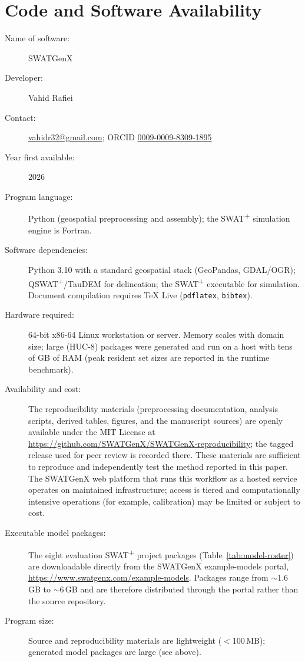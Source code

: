 \section*{Code and Software Availability}

\noindent
\begin{description}
  \item[Name of software:] SWATGenX
  \item[Developer:] Vahid Rafiei
  \item[Contact:] \href{mailto:vahidr32@gmail.com}{vahidr32@gmail.com}; ORCID \href{https://orcid.org/0009-0009-8309-1895}{0009-0009-8309-1895}
  \item[Year first available:] 2026
  \item[Program language:] Python (geospatial preprocessing and assembly); the SWAT\textsuperscript{+} simulation engine is Fortran.
  \item[Software dependencies:] Python 3.10 with a standard geospatial stack (GeoPandas, GDAL/OGR); QSWAT\textsuperscript{+}/TauDEM for delineation; the SWAT\textsuperscript{+} executable for simulation. Document compilation requires TeX Live (\texttt{pdflatex}, \texttt{bibtex}).
  \item[Hardware required:] 64-bit x86-64 Linux workstation or server. Memory scales with domain size; large (HUC-8) packages were generated and run on a host with tens of GB of RAM (peak resident set sizes are reported in the runtime benchmark).
  \item[Availability and cost:] The reproducibility materials (preprocessing documentation, analysis scripts, derived tables, figures, and the manuscript sources) are openly available under the MIT License at \url{https://github.com/SWATGenX/SWATGenX-reproducibility}; the tagged release used for peer review is recorded there. These materials are sufficient to reproduce and independently test the method reported in this paper. The SWATGenX web platform that runs this workflow as a hosted service operates on maintained infrastructure; access is tiered and computationally intensive operations (for example, calibration) may be limited or subject to cost.
  \item[Executable model packages:] The eight evaluation SWAT\textsuperscript{+} project packages (Table~\ref{tab:model-roster}) are downloadable directly from the SWATGenX example-models portal, \url{https://www.swatgenx.com/example-models}. Packages range from $\sim$1.6\,GB to $\sim$6\,GB and are therefore distributed through the portal rather than the source repository.
  \item[Program size:] Source and reproducibility materials are lightweight ($<$100\,MB); generated model packages are large (see above).
\end{description}
